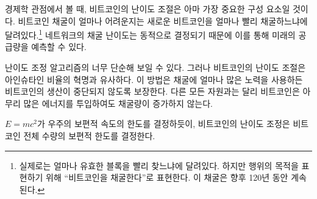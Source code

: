\begin{comment}	
	Viewed through the lens of economics, Bitcoin's \textit{difficulty adjustment}
	is probably its most important component. How hard it is to mine bitcoin depends
	on how quickly new bitcoins are mined.\footnote{It actually depends on how
		quickly valid blocks are found, but for our purposes, this is the same thing as
		\enquote{mining bitcoins} and will be so for the next 120 years.} It is the dynamic
	adjustment of the network's mining difficulty which enables us to predict its
	future supply.
\end{comment}
경제학 관점에서 볼 때, 비트코인의 난이도 조절은 아마 가장 중요한 구성 요소일 것이다.
비트코인 채굴이 얼마나 어려운지는 새로운 비트코인을 얼마나 빨리 채굴하느냐에 달려있다.\footnote{실제로는 얼마나 유효한 블록을 빨리 찾느냐에 달려있다. 
	하지만 행위의 목적을 표현하기 위해 \enquote{비트코인을 채굴한다}로 표현한다. 
	이 채굴은 향후 120년 동안 계속된다.}
네트워크의 채굴 난이도는 동적으로 결정되기 때문에 이를 통해 미래의 공급량을 예측할 수 있다.

\begin{comment}	
	The simplicity of the difficulty adjustment algorithm might distract
	from its profundity, but the difficulty adjustment truly is a revolution
	of Einsteinian proportions. It ensures that, no matter how much or how
	little effort is spent on mining, Bitcoin's controlled supply won't be
	disrupted. As opposed to every other resource, no matter how much
	energy someone will put into mining bitcoin, the total reward will not
	increase.
\end{comment}
난이도 조정 알고리즘의 너무 단순해 보일 수 있다. 
그러나 비트코인의 난이도 조절은 아인슈타인 비율의 혁명과 유사하다.
이 방법은 채굴에 얼마나 많은 노력을 사용하든 비트코인의 생산이 중단되지 않도록 보장한다.
다른 모든 자원과는 달리 비트코인은 아무리 많은 에너지를 투입하여도 채굴량이 증가하지 않는다.

\begin{comment}	
	Just like $E=mc^2$ dictates the universal speed limit in our universe,
	Bitcoin's difficulty adjustment dictates the \textbf{universal money limit}
	in Bitcoin.
\end{comment}
$E=mc^2$가 우주의 보편적 속도의 한도를 결정하듯이, 
비트코인의 난이도 조정은 비트코인 전체 수량의 보편적 한도를 결정한다.

